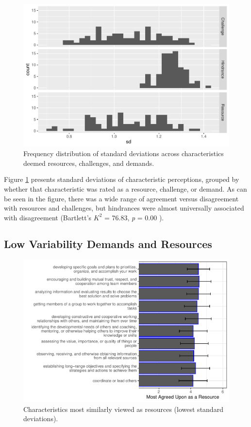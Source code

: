 \documentclass[
  man]{apa6}
\begin{document}
\begin{figure}
\centering
\includegraphics{Submission_files/figure-latex/overallhist-1.pdf}
\caption{\label{fig:overallhist}Frequency distribution of standard deviations across characteristics deemed resources, challenges, and demands.}
\end{figure}

Figure \ref{fig:overallhist} presents standard deviations of characteristic perceptions, grouped by whether that characteristic was rated as a resource, challenge, or demand. As can be seen in the figure, there was a wide range of agreement versus disagreement with resources and challenges, but hindrances were almost universally associated with disagreement (Bartlett's \(K^2\) = 76.83, \emph{p} = 0.00 ).

\hypertarget{low-variability-demands-and-resources}{%
\subsection{Low Variability Demands and Resources}\label{low-variability-demands-and-resources}}

\begin{figure}
\centering
\includegraphics{Submission_files/figure-latex/resourcesagree-1.pdf}
\caption{\label{fig:resourcesagree}Characteristics most similarly viewed as resources (lowest standard deviations).}
\end{figure}
\end{document}
